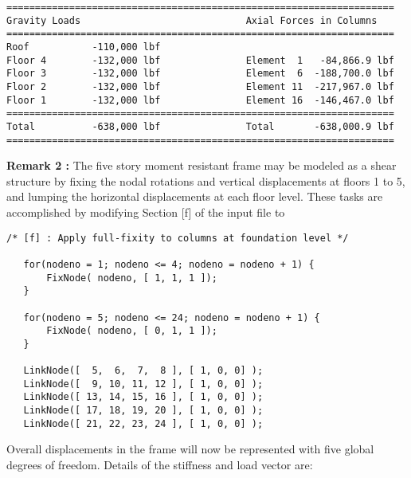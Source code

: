 \begin{footnotesize}
\begin{verbatim}
====================================================================
Gravity Loads                             Axial Forces in Columns
====================================================================
Roof           -110,000 lbf                
Floor 4        -132,000 lbf               Element  1   -84,866.9 lbf
Floor 3        -132,000 lbf               Element  6  -188,700.0 lbf
Floor 2        -132,000 lbf               Element 11  -217,967.0 lbf
Floor 1        -132,000 lbf               Element 16  -146,467.0 lbf
====================================================================
Total          -638,000 lbf               Total       -638,000.9 lbf
====================================================================
\end{verbatim}
\end{footnotesize}

\vspace{0.15 in}\noindent
{\bf Remark 2 :} The five story moment resistant frame
may be modeled as a shear structure by fixing the nodal
rotations and vertical displacements at floors 1 to 5,
and lumping the horizontal displacements at each floor level.
These tasks are accomplished by modifying
Section [f] of the input file to

\begin{footnotesize}
\begin{verbatim}
/* [f] : Apply full-fixity to columns at foundation level */

   for(nodeno = 1; nodeno <= 4; nodeno = nodeno + 1) {
       FixNode( nodeno, [ 1, 1, 1 ]);
   }

   for(nodeno = 5; nodeno <= 24; nodeno = nodeno + 1) {
       FixNode( nodeno, [ 0, 1, 1 ]);
   }

   LinkNode([  5,  6,  7,  8 ], [ 1, 0, 0] );
   LinkNode([  9, 10, 11, 12 ], [ 1, 0, 0] );
   LinkNode([ 13, 14, 15, 16 ], [ 1, 0, 0] );
   LinkNode([ 17, 18, 19, 20 ], [ 1, 0, 0] );
   LinkNode([ 21, 22, 23, 24 ], [ 1, 0, 0] );
\end{verbatim}
\end{footnotesize}

\vspace{0.15 in}\noindent
Overall displacements in the frame will now be
represented with five global degrees of freedom.
Details of the stiffness and load vector are:

